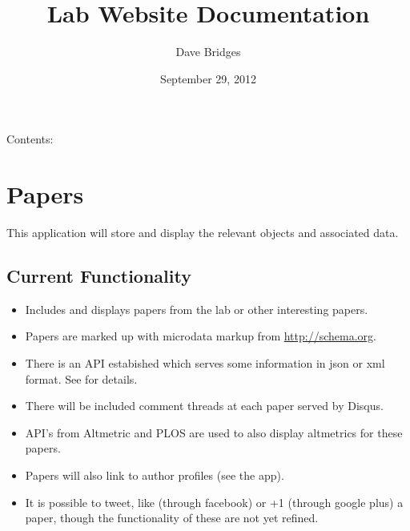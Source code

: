 \documentclass[letterpaper,10pt,english]{sphinxmanual}
\title{Lab Website Documentation}
\date{September 29, 2012}
\author{Dave Bridges}
\begin{document}
\maketitle
\tableofcontents
{}\label{index::doc}


Contents:


\chapter{Papers}
\label{papers:papers}\label{papers::doc}\label{papers:module-papers}\label{papers:welcome-to-lab-website-s-documentation}
This application will store and display the relevant {\hyperref[papers:papers.models.Publication]{}} objects and associated data.


\section{Current Functionality}
\label{papers:current-functionality}\begin{itemize}
\item {} 
Includes and displays papers from the lab or other interesting papers.

\item {} 
Papers are marked up with microdata markup from \href{http://schema.org}{http://schema.org}.

\item {} 
There is an API estabished which serves some {\hyperref[papers:papers.models.Publication]{}} information in json or xml format.  See {\hyperref[papers:module-papers.api]{}} for details.

\item {} 
There will be included comment threads at each paper served by Disqus.

\item {} 
API's from Altmetric and PLOS are used to also display altmetrics for these papers.

\item {} 
Papers will also link to author profiles (see the  app).

\item {} 
It is possible to tweet, like (through facebook) or +1 (through google plus) a paper, though the functionality of these are not yet refined.

\end{itemize}
\end{document}

